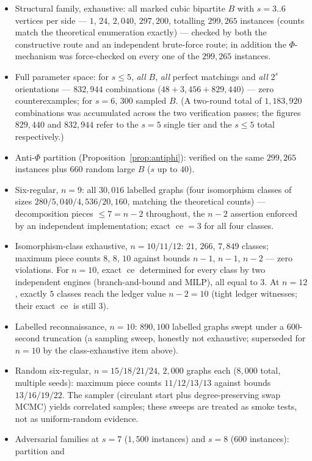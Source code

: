 \documentclass[a4paper,11pt]{amsart}
\theoremstyle{definition}
\theoremstyle{remark}
\newcommand{\ce}{\operatorname{ce}}
\begin{document}
\begin{itemize}
\item Structural family, exhaustive: all marked cubic bipartite $B$ with $s=3..6$ vertices per side ---
$1$, $24$, $2{,}040$, $297{,}200$, totalling $299{,}265$ instances (counts match the theoretical
enumeration exactly) --- checked by both the constructive route and an independent brute-force route; in
addition the $\Phi$-mechanism was force-checked on every one of the $299{,}265$ instances.
\item Full parameter space: for $s\le5$, \emph{all} $B$, \emph{all} perfect matchings and \emph{all}
$2^s$ orientations --- $832{,}944$ combinations ($48+3{,}456+829{,}440$) --- zero counterexamples; for
$s=6$, $300$ sampled $B$. (A two-round total of $1{,}183{,}920$ combinations was accumulated across the
two verification passes; the figures $829{,}440$ and $832{,}944$ refer to the $s=5$ single tier and the
$s\le5$ total respectively.)
\item Anti-$\Phi$ partition (Proposition~\ref{prop:antiphi}): verified on the same $299{,}265$ instances
plus $660$ random large $B$ ($s$ up to $40$).
\item Six-regular, $n=9$: all $30{,}016$ labelled graphs (four isomorphism classes of sizes
$280/5{,}040/4{,}536/20{,}160$, matching the theoretical counts) --- decomposition pieces $\le7=n-2$
throughout, the $n-2$ assertion enforced by an independent implementation; exact $\ce=3$ for all four
classes.
\item Isomorphism-class exhaustive, $n=10/11/12$: $21$, $266$, $7{,}849$ classes; maximum piece counts
$8$, $8$, $10$ against bounds $n-1$, $n-1$, $n-2$ --- zero violations. For $n=10$, exact $\ce$ determined
for every class by two independent engines (branch-and-bound and MILP), all equal to $3$. At $n=12$,
exactly $5$ classes reach the ledger value $n-2=10$ (tight ledger witnesses; their exact $\ce$ is still
$3$).
\item Labelled reconnaissance, $n=10$: $890{,}100$ labelled graphs swept under a $600$-second truncation
(a sampling sweep, honestly not exhaustive; superseded for $n=10$ by the class-exhaustive item above).
\item Random six-regular, $n=15/18/21/24$, $2{,}000$ graphs each ($8{,}000$ total, multiple seeds):
maximum piece counts $11/12/13/13$ against bounds $13/16/19/22$. The sampler (circulant start plus
degree-preserving swap MCMC) yields correlated samples; these sweeps are treated as smoke tests, not as
uniform-random evidence.
\item Adversarial families at $s=7$ ($1{,}500$ instances) and $s=8$ ($600$ instances): partition and

\end{itemize}
\end{document}
